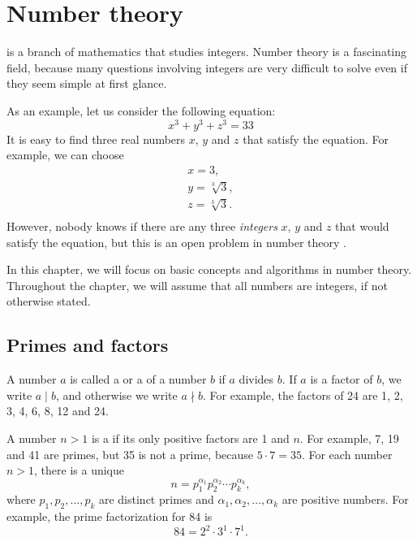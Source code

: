 \chapter{Number theory}


 is a branch of mathematics
that studies integers.
Number theory is a fascinating field,
because many questions involving integers
are very difficult to solve even if they
seem simple at first glance.

As an example, let us consider the following equation:
\[x^3 + y^3 + z^3 = 33\]
It is easy to find three real numbers $x$, $y$ and $z$
that satisfy the equation.
For example, we can choose
\[
\begin{array}{lcl}
x = 3, \\
y = \sqrt[3]{3}, \\
z = \sqrt[3]{3}.\\
\end{array}
\]
However, nobody knows if there are any three
\emph{integers} $x$, $y$ and $z$
that would satisfy the equation, but this
is an open problem in number theory \cite{bec07}.

In this chapter, we will focus on basic concepts
and algorithms in number theory.
Throughout the chapter, we will assume that all numbers
are integers, if not otherwise stated.

\section{Primes and factors}


A number $a$ is called a  or a  of a number $b$
if $a$ divides $b$.
If $a$ is a factor of $b$,
we write $a \mid b$, and otherwise we write $a \nmid b$.
For example, the factors of 24 are
1, 2, 3, 4, 6, 8, 12 and 24.


A number $n>1$ is a 
if its only positive factors are 1 and $n$.
For example, 7, 19 and 41 are primes,
but 35 is not a prime, because $5 \cdot 7 = 35$.
For each number $n>1$, there is a unique
\[ n = p_1^{\alpha_1} p_2^{\alpha_2} \cdots p_k^{\alpha_k},\]
where $p_1,p_2,\ldots,p_k$ are distinct primes and
$\alpha_1,\alpha_2,\ldots,\alpha_k$ are positive numbers.
For example, the prime factorization for 84 is
\[84 = 2^2 \cdot 3^1 \cdot 7^1.\]

